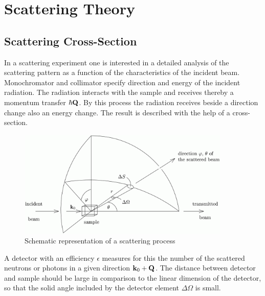 \chapter{Scattering Theory}
\label{chap:basics}

\section{Scattering Cross-Section}
\label{crosssection}

In a scattering experiment one is interested in a detailed
analysis of the scattering pattern as a function of the
characteristics of the incident beam. Monochromator and collimator
specify direction and energy of the incident radiation.  The
radiation interacts with the sample and receives thereby a
momentum transfer $\hbar \B{Q}$. By this process the radiation
receives beside a direction change also an energy change. The
result is described with the help of a cross-section.

\begin{figure}[htb]
\begin{center}
\includegraphics[width=0.9\textwidth]{EwaldSphereTeX.png}
\end{center}
\caption{Schematic representation of a scattering process}
\label{scatt2}
\end{figure}

A detector with an efficiency $\epsilon$ measures for this the
number of the scattered neutrons or photons in a given direction
${\bf k}_0+\bf Q$.  The distance between detector and sample
should be large in comparison to the linear dimension of the
detector, so that the solid angle included by the detector element
$\Delta\Omega$ is small.

